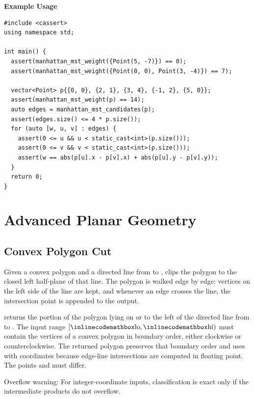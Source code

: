 \textbf{Example Usage}\par
\begin{lstlisting}[style=cpp]
#include <cassert>
using namespace std;

int main() {
  assert(manhattan_mst_weight({Point(5, -7)}) == 0);
  assert(manhattan_mst_weight({Point(0, 0), Point(3, -4)}) == 7);

  vector<Point> p{{0, 0}, {2, 1}, {3, 4}, {-1, 2}, {5, 0}};
  assert(manhattan_mst_weight(p) == 14);
  auto edges = manhattan_mst_candidates(p);
  assert(edges.size() <= 4 * p.size());
  for (auto [w, u, v] : edges) {
    assert(0 <= u && u < static_cast<int>(p.size()));
    assert(0 <= v && v < static_cast<int>(p.size()));
    assert(w == abs(p[u].x - p[v].x) + abs(p[u].y - p[v].y));
  }
  return 0;
}
\end{lstlisting}

\section{\texorpdfstring{Advanced Planar Geometry}{7.4 Advanced Planar Geometry}}
\setcounter{section}{4}
\setcounter{subsection}{0}
\subsection{Convex Polygon Cut}
\label{sec:7.4.1}
Given a convex polygon and a directed line from  to , clips the polygon to the closed left half-plane of that line. The polygon is walked edge by edge: vertices on the left side of the line are kept, and whenever an edge crosses the line, the intersection point is appended to the output.

\begin{compactitem}
  \item {} returns the portion of the polygon lying on or to the left of the directed line from  to . The input range $[{\inlinecodemath{lo}}, {\inlinecodemath{hi}})$ must contain the vertices of a convex polygon in boundary order, either clockwise or counterclockwise. The returned polygon preserves that boundary order and uses  with  coordinates because edge-line intersections are computed in floating point. The points  and  must differ.
\end{compactitem}

Overflow warning: For integer-coordinate inputs, classification is exact only if the intermediate products do not overflow.

